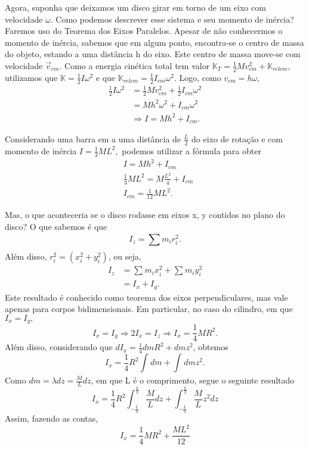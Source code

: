 \documentclass[physicsII_notes.tex]{subfiles}
\begin{document}
Agora, suponha que deixamos um disco girar em torno de um eixo com velocidade \(\omega \). Como podemos descrever esse sistema e seu momento de inércia?
Faremos uso do Teorema dos Eixos Paralelos. Apesar de não conhecermos o momento de inércia, sabemos que em algum ponto, encontra-se o centro
de massa do objeto, estando a uma distância h do eixo. Este centro de massa move-se com velocidade \(\vec{v}_{cm}\). Como a energia cinética total
tem valor \(\mathbb{K}_{T} = \frac{1}{2}Mv_{cm}^{2} + \mathbb{K}_{relcm}\), utilizamos que \(\mathbb{K} = \frac{1}{2}I\omega^{2}\) e que \(\mathbb{K}_{relcm}=\frac{1}{2}I_{cm}\omega ^{2}\).
Logo, como \(v_{cm} = h\omega ,\)
\begin{align*}
	\frac{1}{2}I\omega^{2} & = \frac{1}{2} Mv_{cm}^{2} + \frac{1}{2}I_{cm}\omega^{2} \\
	                       & = Mh^{2}\omega^{2} + I_{cm}\omega ^{2}                  \\
	                       & \Rightarrow I = Mh^{2} + I_{cm}.
\end{align*}
\begin{example}
	Considerando uma barra em a uma distância de \(\frac{L}{2}\) do eixo de rotação e com momento de inércia
	\(I = \frac{1}{3}ML^{2},\) podemos utilizar a fórmula para obter
	\begin{align*}
		 & I = Mh^{2} + I_{cm}                            \\
		 & \frac{1}{3}ML^{2} = M \frac{L^{2}}{4} + I_{cm} \\
		 & I_{cm} = \frac{1}{12}ML^{2}.
	\end{align*}
\end{example}
Mas, o que aconteceria se o disco rodasse em eixos x, y contidos no plano do disco? O que sabemos é que
\[
	I_{z} = \sum\limits_{}^{}m_{i}r_{i}^{2}.
\]
Além disso, \(r_{i}^{2} = (x_{i}^{2} + y_{i}^{2})\), ou seja,
\begin{align*}
	I_{z} & = \sum\limits_{}^{}m_{i}x_{i}^{2} + \sum\limits_{}^{}m_{i}y_{i}^{2} \\
	      & = I_{x} + I_{y}.
\end{align*}
Este resultado é conhecido como teorema dos eixos perpendiculares, mas vale apenas para corpos bidimensionais.
Em particular, no caso do cilindro, em que \(I_{x} = I_{y},\)
\[
	I_{x} = I_{y} \Rightarrow 2I_{x} = I_{z} \Rightarrow I_{x} = \frac{1}{4}MR^{2}.
\]
Além disso, considerando que \(dI_{x} = \frac{1}{4}dm R^{2} + dm z^{2}\), obtemos
\[
	I_{x} = \frac{1}{4}R^{2} \int_{}^{}dm + \int_{}^{}dm z^{2}.
\]
Como \(dm = \lambda dz = \frac{M}{L}dz\), em que L é o comprimento, segue o seguinte resultado
\[
	I_{x} = \frac{1}{4}R^{2}\int_{-\frac{L}{2}}^{\frac{L}{2}}\frac{M}{L}dz + \int_{-\frac{L}{2}}^{\frac{L}{2}}\frac{M}{L}z^{2}dz
\]
Assim, fazendo as contas,
\[
	I_{x} = \frac{1}{4}MR^{2} + \frac{ML^{2}}{12}
\]
\end{document}
